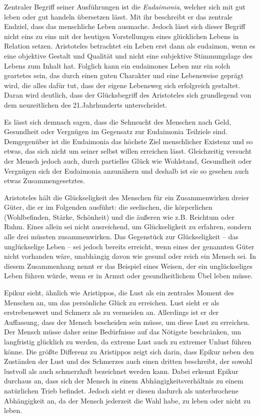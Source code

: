 Zentraler Begriff seiner Ausführungen ist die \textit{Eudaimonia}, welcher sich mit \glqq gut leben\grqq{} oder \glqq gut handeln\grqq{} übersetzen lässt\cite[S.\,5]{MF93}.
Mit ihr beschreibt er das zentrale Endziel, dass das menschliche Leben ausmache. 
Jedoch lässt sich dieser Begriff nicht eins zu eins mit der heutigen Vorstellungen eines glücklichen Lebens in Relation setzen.
Aristoteles betrachtet ein Leben erst dann als eudaimon, wenn es eine \glqq objektive Gestalt und Qualität und nicht eine subjektive Stimmungslage des Lebens zum Inhalt hat.\grqq{}\cite[S.\,5]{MF93}
 Folglich kann ein eudaimones Leben nur ein solch geartetes sein, das durch einen guten Charakter und eine Lebensweise geprägt wird, die alles dafür tut, dass der eigene Lebensweg sich erfolgreich gestaltet. 
 Daran wird deutlich, dass der Glücksbegriff des Aristoteles sich grundlegend von dem neuzeitlichen des 21.Jahrhunderts unterscheidet.
 
Es lässt sich demnach sagen, dass die Sehnsucht des Menschen nach Geld, Gesundheit oder Vergnügen im Gegensatz zur Eudaimonia Teilziele sind. 
Demgegenüber ist die Eudaimonia das höchste Ziel menschlicher Existenz und so etwas, das sich nicht um seiner selbst willen erreichen lässt. 
Gleichzeitig versucht der Mensch jedoch auch, durch partielles Glück wie Wohlstand, Gesundheit oder Vergnügen sich der Eudaimonia anzunähern und deshalb ist sie so gesehen auch etwas Zusammengesetztes. 

Aristoteles hält die Glückseligkeit des Menschen für ein Zusammenwirken dreier Güter, die er im Folgenden ausführt: die seelischen, die körperlichen (Wohlbefinden, Stärke, Schönheit) und die äußeren wie z.B. Reichtum oder Ruhm\cite[S.\,257f]{AD67}.
Eines allein sei nicht ausreichend, um Glückseligkeit zu erfahren, sondern alle drei müssten zusammenwirken. 
Das Gegenstück zur Glückseligkeit -- das unglückselige Leben -- sei jedoch bereits erreicht, wenn eines der genannten Güter nicht vorhanden wäre, unabhängig davon wie gesund oder reich ein Mensch sei. 
In diesem Zusammenhang nennt er das Beispiel eines Weisen, der ein unglückseliges Leben führen würde, wenn er in Armut oder gesundheitlichem Übel leben müsse.

Epikur sieht, ähnlich wie Aristippos, die Lust als ein zentrales Moment des Menschen an, um das persönliche Glück zu erreichen. 
Lust sieht er als erstrebenswert und Schmerz als zu vermeiden an. 
Allerdings ist er der Auffassung, dass der Mensch bescheiden sein müsse, um diese Lust zu erreichen.
Der Mensch müsse daher seine Bedürfnisse auf das Nötigste beschränken, um langfristig glücklich zu werden, da extreme Lust auch zu extremer Unlust führen könne.
Die größte Differenz zu Aristippos zeigt sich darin, dass Epikur neben den Zuständen der Lust und des Schmerzes auch einen dritten beschreibt, der sowohl lustvoll als auch schmerzhaft bezeichnet werden kann\cite[S.\,32]{MF93}. 
Dabei erkennt Epikur durchaus an, dass sich der Mensch in einem Abhängigkeitsverhältnis zu einem natürlichen Trieb befindet. 
Jedoch sieht er diesen dadurch als unterbrochene Abhängigkeit an, da der Mensch jederzeit die Wahl habe, zu leben oder nicht zu leben\cite[S.\,36]{MF93}.

